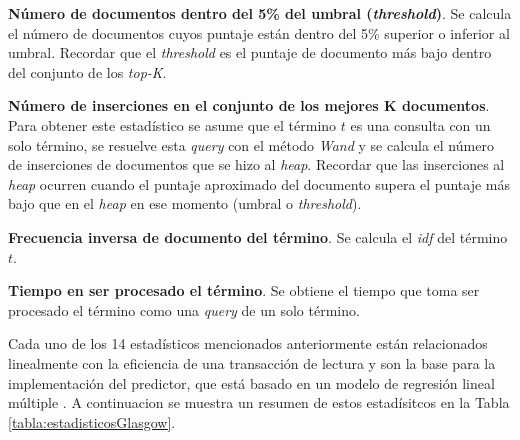 \begin{list}{}{}
	\item \textbf{Número de documentos dentro del 5\% del umbral (\textit{threshold})}. Se calcula el número de documentos cuyos puntaje están dentro del 5\% superior o inferior al umbral. Recordar que el \textit{threshold} es el puntaje de documento más bajo dentro del conjunto de los \textit{top-K}.
	
	\item \textbf{Número de inserciones en el conjunto de los mejores K documentos}. Para obtener este estadístico se asume que el término $t$ es una consulta con un solo término, se resuelve esta \textit{query} con el método \textit{Wand}  y se calcula el número de inserciones de documentos que se hizo al \textit{heap}. Recordar que las inserciones al \textit{heap} ocurren cuando el puntaje aproximado del documento supera el puntaje más bajo que en el \textit{heap} en ese momento (umbral o \textit{threshold}).
	
	\item \textbf{Frecuencia inversa de documento del término}. Se calcula el \textit{idf} del término $t$.
	
	\item \textbf{Tiempo en ser procesado el término}. Se obtiene el tiempo que toma ser procesado el término como una \textit{query} de un solo término.

\end{list}


Cada uno de los 14 estadísticos mencionados anteriormente están relacionados linealmente con la eficiencia de una transacción de lectura y son la base para la implementación del predictor, que está basado en un modelo de regresión lineal múltiple \citep{Chambers:1991}. A continuacion se muestra un resumen de estos estadísitcos en la Tabla \ref{tabla:estadisticosGlasgow}. 

